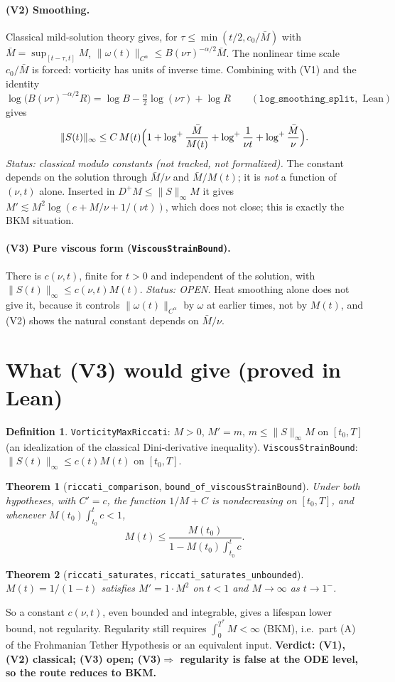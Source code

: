 \documentclass[11pt]{article}
\newtheorem{theorem}{Theorem}\newtheorem{proposition}{Proposition}
\theoremstyle{definition}\newtheorem{definition}{Definition}
\begin{document}
\paragraph{(V2) Smoothing.} Classical mild-solution theory gives, for $\tau\le\min(t/2,c_0/\bar M)$ with $\bar M=\sup_{[t-\tau,t]}M$,
$\|\omega(t)\|_{C^\alpha}\le B(\nu\tau)^{-\alpha/2}\bar M$. The nonlinear time scale $c_0/\bar M$ is forced: vorticity has units of inverse time. Combining with (V1) and the identity
\[
\log\bigl(B(\nu\tau)^{-\alpha/2}R\bigr)=\log B-\tfrac\alpha2\log(\nu\tau)+\log R\qquad(\texttt{log\_smoothing\_split}, \text{ Lean})
\]
gives
\[
\|S(t)\|_\infty\le C\,M(t)\Bigl(1+\log^+\frac{\bar M}{M(t)}+\log^+\frac{1}{\nu t}+\log^+\frac{\bar M}{\nu}\Bigr).
\]
\emph{Status: classical modulo constants (not tracked, not formalized).} The constant depends on the solution through $\bar M/\nu$ and $\bar M/M(t)$; it is \emph{not} a function of $(\nu,t)$ alone. Inserted in $D^+M\le\|S\|_\infty M$ it gives $M'\lesssim M^2\log(e+M/\nu+1/(\nu t))$, which does not close; this is exactly the BKM situation.

\paragraph{(V3) Pure viscous form (\texttt{ViscousStrainBound}).} There is $c(\nu,t)$, finite for $t>0$ and independent of the solution, with $\|S(t)\|_\infty\le c(\nu,t)M(t)$. \emph{Status: OPEN.} Heat smoothing alone does not give it, because it controls $\|\omega(t)\|_{C^\alpha}$ by $\omega$ at earlier times, not by $M(t)$, and (V2) shows the natural constant depends on $\bar M/\nu$.

\section{What (V3) would give (proved in Lean)}
\begin{definition}
\texttt{VorticityMaxRiccati}: $M>0$, $M'=m$, $m\le\|S\|_\infty M$ on $[t_0,T]$ (an idealization of the classical Dini-derivative inequality). \texttt{ViscousStrainBound}: $\|S(t)\|_\infty\le c(t)M(t)$ on $[t_0,T]$.
\end{definition}
\begin{theorem}[\texttt{riccati\_comparison}, \texttt{bound\_of\_viscousStrainBound}]
Under both hypotheses, with $C'=c$, the function $1/M+C$ is nondecreasing on $[t_0,T]$, and whenever $M(t_0)\int_{t_0}^tc<1$,
\[
M(t)\le\frac{M(t_0)}{1-M(t_0)\int_{t_0}^tc}.
\]
\end{theorem}
\begin{theorem}[\texttt{riccati\_saturates}, \texttt{riccati\_saturates\_unbounded}]
$M(t)=1/(1-t)$ satisfies $M'=1\cdot M^2$ on $t<1$ and $M\to\infty$ as $t\to1^-$.
\end{theorem}
So a constant $c(\nu,t)$, even bounded and integrable, gives a lifespan lower bound, not regularity. Regularity still requires $\int_0^{T^*}M<\infty$ (BKM), i.e.\ part (A) of the Frohmanian Tether Hypothesis or an equivalent input. \textbf{Verdict: (V1),(V2) classical; (V3) open; (V3)$\Rightarrow$ regularity is false at the ODE level, so the route reduces to BKM.}
\end{document}
